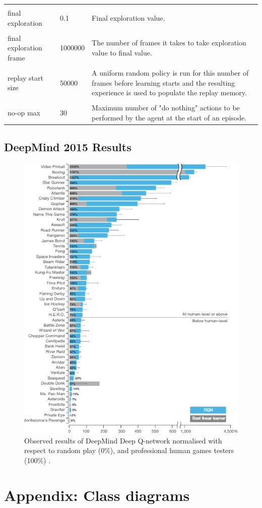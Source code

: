 \documentclass[10pt]{article}
\begin{document}
\begin{table}[h]
\begin{tabular}{p{3cm} l p{8cm}}
 & & \\
final exploration & 0.1 & Final exploration value.\\
 & & \\
final exploration frame & 1000000 & The number of frames it takes to take exploration value to final value.\\
 & & \\
replay start size & 50000 & A uniform random policy is run for this number of frames before learning starts and the resulting experience is used to populate the replay memory.\\
 & & \\
no-op max & 30 & Maximum number of "do nothing" actions to be performed by the agent at the start of an episode.                                                    
\end{tabular}
\end{table}
\newpage
\subsection{DeepMind 2015 Results}
		\begin{figure}[h]
    		\centering
			\includegraphics[scale=0.7]{img/dmResults}
			\caption{Observed results of DeepMind Deep Q-network normalised with respect to random play (0\%), and professional human games testers (100\%) \cite{humanlevel}.}
			\label{fig:2015results}
		\end{figure}
\newpage
\section{Appendix: Class diagrams}
\end{document}
